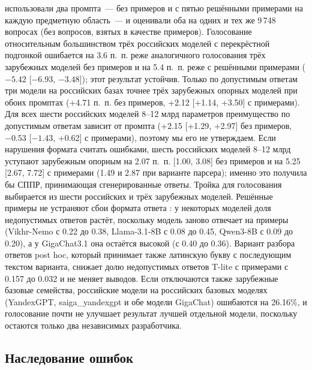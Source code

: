 \documentclass[preprint,12pt,authoryear]{elsarticle}
\begin{document}
использовали два промпта~--- без примеров и с пятью решёнными примерами на каждую предметную область~--- и оценивали оба на одних и тех же 9\,748 вопросах (без вопросов, взятых в качестве примеров). Голосование относительным большинством трёх российских моделей с перекрёстной подгонкой ошибается на 3.6 п.~п. реже аналогичного голосования трёх зарубежных моделей без примеров и на 5.4 п.~п. реже с решёнными примерами ($-5.42$ [$-6.93$, $-3.48$]); этот результат устойчив. Только по допустимым ответам три модели на российских базах точнее трёх зарубежных опорных моделей при обоих промптах (+4.71 п.~п. без примеров, +2.12 [+1.14, +3.50] с примерами). Для всех шести российских моделей 8--12 млрд параметров преимущество по допустимым ответам зависит от промпта (+2.15 [+1.29, +2.97] без примеров, $-0.53$ [$-1.43$, +0.62] с примерами), поэтому мы его не утверждаем. Если нарушения формата считать ошибками, шесть российских моделей 8--12 млрд уступают зарубежным опорным на 2.07 п.~п. [1.00, 3.08] без примеров и на 5.25 [2.67, 7.72] с примерами (1.49 и 2.87 при варианте парсера); именно это получила бы СППР, принимающая сгенерированные ответы. Тройка для голосования выбирается из шести российских и трёх зарубежных моделей. Решённые примеры не устраняют сбои формата ответа \citep{sclar2024format}: у некоторых моделей доля недопустимых ответов растёт, поскольку модель заново отвечает на примеры (Vikhr-Nemo с 0.22 до 0.38, Llama-3.1-8B с 0.08 до 0.45, Qwen3-8B с 0.09 до 0.20), а у GigaChat3.1 она остаётся высокой (с 0.40 до 0.36). Вариант разбора ответов post hoc, который принимает также латинскую букву с последующим текстом варианта, снижает долю недопустимых ответов T-lite с примерами с 0.157 до 0.032 и не меняет выводов. Если отключаются также зарубежные базовые семейства, российские модели на российских базовых моделях (YandexGPT, saiga\_yandexgpt и обе модели GigaChat) ошибаются на 26.16\%, и голосование почти не улучшает результат лучшей отдельной модели, поскольку остаются только два независимых разработчика.

\subsection{Наследование ошибок}
\end{document}
